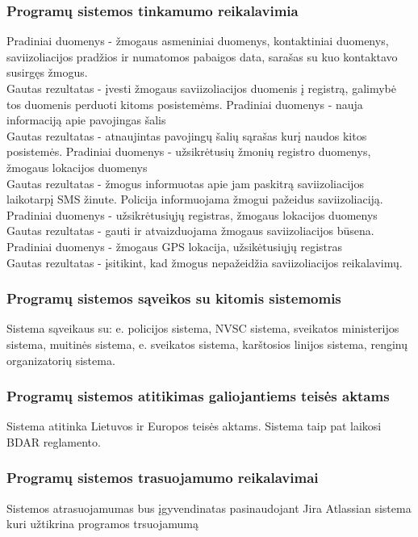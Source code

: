 \documentclass{VUMIFPSkursinis}
\begin{document}
	\subsubsection{Programų sistemos tinkamumo reikalavimia}
			Pradiniai duomenys - žmogaus asmeniniai duomenys, kontaktiniai duomenys, saviizoliacijos pradžios ir numatomos pabaigos data, sarašas su kuo kontaktavo susirgęs žmogus.
			\\
			Gautas rezultatas - įvesti žmogaus saviizoliacijos duomenis į registrą, galimybė tos duomenis perduoti kitoms posistemėms.
			Pradiniai duomenys - nauja informaciją apie pavojingas šalis
			\\
			Gautas rezultatas - atnaujintas pavojingų šalių sąrašas kurį naudos kitos posistemės.
			Pradiniai duomenys - užsikrėtusių žmonių registro duomenys, žmogaus lokacijos duomenys
			\\
			Gautas rezultatas - žmogus informuotas apie jam paskitrą saviizoliacijos laikotarpį SMS žinute. Policija informuojama žmogui pažeidus saviizoliaciją.
			Pradiniai duomenys - užsikrėtusiųjų registras, žmogaus lokacijos duomenys
			\\
			Gautas rezultatas - gauti ir atvaizduojama žmogaus saviizoliacijos būsena.
			Pradiniai duomenys - žmogaus GPS lokacija, užsikėtusiųjų registras
			\\
			Gautas rezultatas - įsitikint, kad žmogus nepažeidžia saviizoliacijos reikalavimų.
	\subsubsection{Programų sistemos sąveikos su kitomis sistemomis}
		Sistema sąveikaus su: e. policijos sistema, NVSC sistema, sveikatos ministerijos sistema, muitinės sistema, e. sveikatos sistema, karštosios linijos sistema, renginų organizatorių sistema.
	\subsubsection{Programų sistemos atitikimas galiojantiems teisės aktams}
		Sistema atitinka Lietuvos ir Europos teisės aktams. 
		Sistema taip pat laikosi BDAR reglamento.
	\subsubsection{Programų sistemos trasuojamumo reikalavimai}
		Sistemos atrasuojamumas bus įgyvendinatas pasinaudojant Jira Atlassian sistema kuri užtikrina programos trsuojamumą
\end{document}
